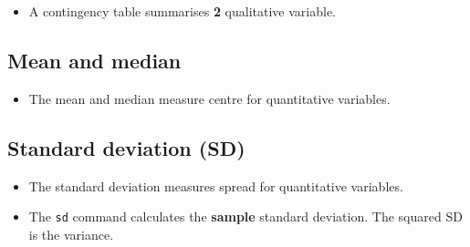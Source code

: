 \documentclass[]{article}
\newenvironment{Shaded}{\begin{snugshade}}{\end{snugshade}}
\newcommand{\KeywordTok}[1]{\textcolor[rgb]{0.13,0.29,0.53}{\textbf{#1}}}
\newcommand{\NormalTok}[1]{#1}
\newcommand{\OperatorTok}[1]{\textcolor[rgb]{0.81,0.36,0.00}{\textbf{#1}}}
\providecommand{\tightlist}{%
  \setlength{\itemsep}{0pt}\setlength{\parskip}{0pt}}
\begin{document}
\begin{Shaded}
\end{Shaded}

\begin{itemize}
\tightlist
\item
  A contingency table summarises \textbf{2} qualitative variable.
\end{itemize}

\begin{Shaded}
\end{Shaded}

\hypertarget{mean-and-median}{%
\subsection{Mean and median}\label{mean-and-median}}

\begin{itemize}
\tightlist
\item
  The mean and median measure centre for quantitative variables.
\end{itemize}

\begin{Shaded}
\end{Shaded}

\hypertarget{standard-deviation-sd}{%
\subsection{Standard deviation (SD)}\label{standard-deviation-sd}}

\begin{itemize}
\item
  The standard deviation measures spread for quantitative variables.
\item
  The \texttt{sd} command calculates the \textbf{sample} standard deviation. The squared SD is the variance.
\end{itemize}
\end{document}
